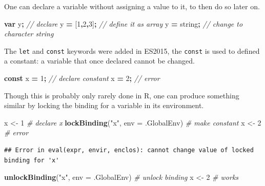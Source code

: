 \documentclass[
]{krantz}
\makeatletter
\newenvironment{Shaded}{\begin{snugshade}}{\end{snugshade}}
\newcommand{\CommentTok}[1]{\textcolor[rgb]{0.37,0.37,0.37}{\textit{#1}}}
\newcommand{\DataTypeTok}[1]{\textcolor[rgb]{0.27,0.27,0.27}{#1}}
\newcommand{\DecValTok}[1]{\textcolor[rgb]{0.06,0.06,0.06}{#1}}
\newcommand{\KeywordTok}[1]{\textcolor[rgb]{0.27,0.27,0.27}{\textbf{#1}}}
\newcommand{\NormalTok}[1]{#1}
\newcommand{\OperatorTok}[1]{\textcolor[rgb]{0.43,0.43,0.43}{\textbf{#1}}}
\newcommand{\StringTok}[1]{\textcolor[rgb]{0.5,0.5,0.5}{#1}}
\newenvironment{kframe}{%
\medskip{}
\setlength{\fboxsep}{.8em}
 \def\at@end@of@kframe{}%
 \ifinner\ifhmode%
  \def\at@end@of@kframe{\end{minipage}}%
  \begin{minipage}{\columnwidth}%
 \fi\fi%
 \def\FrameCommand##1{\hskip\@totalleftmargin \hskip-\fboxsep
 \colorbox{shadecolor}{##1}\hskip-\fboxsep
     \hskip-\linewidth \hskip-\@totalleftmargin \hskip\columnwidth}%
 \MakeFramed {\advance\hsize-\width
   \@totalleftmargin\z@ \linewidth\hsize
   \@setminipage}}%
 {\par\unskip\endMakeFramed%
 \at@end@of@kframe}
\renewenvironment{Shaded}{\begin{kframe}}{\end{kframe}}
\makeatother
\begin{document}
One can declare a variable without assigning a value to it, to then do so later on.

\begin{Shaded}
\begin{Highlighting}[]
\KeywordTok{var}\NormalTok{ y}\OperatorTok{;} \CommentTok{// declare }
\NormalTok{y }\OperatorTok{=}\NormalTok{ [}\DecValTok{1}\OperatorTok{,}\DecValTok{2}\OperatorTok{,}\DecValTok{3}\NormalTok{]}\OperatorTok{;} \CommentTok{// define it as array}
\NormalTok{y }\OperatorTok{=} \StringTok{\textquotesingle{}string\textquotesingle{}}\OperatorTok{;} \CommentTok{// change to character string}
\end{Highlighting}
\end{Shaded}

The \texttt{let} and \texttt{const} keywords were added in ES2015, the \texttt{const} is used to defined a constant: a variable that once declared cannot be changed.

\begin{Shaded}
\begin{Highlighting}[]
\KeywordTok{const}\NormalTok{ x }\OperatorTok{=} \DecValTok{1}\OperatorTok{;} \CommentTok{// declare constant}
\NormalTok{x }\OperatorTok{=} \DecValTok{2}\OperatorTok{;} \CommentTok{// error}
\end{Highlighting}
\end{Shaded}

Though this is probably only rarely done in R, one can produce something similar by locking the binding for a variable in its environment.

\begin{Shaded}
\begin{Highlighting}[]
\NormalTok{x <{-}}\StringTok{ }\DecValTok{1} \CommentTok{\# declare x}
\KeywordTok{lockBinding}\NormalTok{(}\StringTok{"x"}\NormalTok{, }\DataTypeTok{env =}\NormalTok{ .GlobalEnv) }\CommentTok{\# make constant}
\NormalTok{x <{-}}\StringTok{ }\DecValTok{2} \CommentTok{\# error}
\end{Highlighting}
\end{Shaded}

\begin{verbatim}
## Error in eval(expr, envir, enclos): cannot change value of locked binding for 'x'
\end{verbatim}

\begin{Shaded}
\begin{Highlighting}[]
\KeywordTok{unlockBinding}\NormalTok{(}\StringTok{"x"}\NormalTok{, }\DataTypeTok{env =}\NormalTok{ .GlobalEnv) }\CommentTok{\# unlock binding}
\NormalTok{x <{-}}\StringTok{ }\DecValTok{2} \CommentTok{\# works}
\end{Highlighting}
\end{Shaded}
\end{document}
